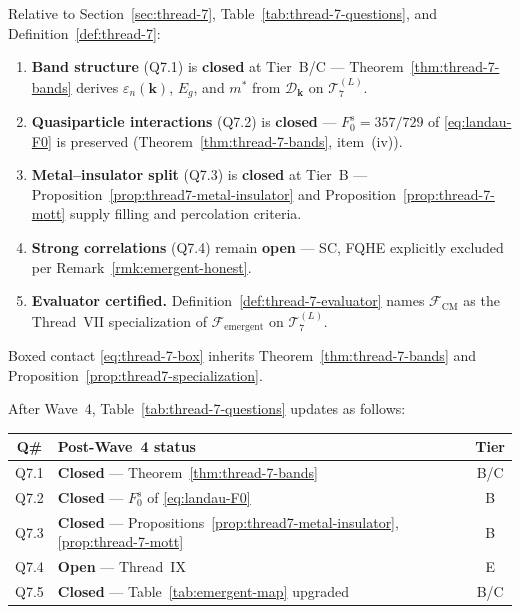 \begin{corollary}
\label{cor:thread-7-wave4-closure}
Relative to Section~\ref{sec:thread-7}, Table~\ref{tab:thread-7-questions},
and Definition~\ref{def:thread-7}:
\begin{enumerate}[label=(\roman*),leftmargin=*]
  \item \textbf{Band structure}
    (Q7.1) is \textbf{closed} at Tier~B/C ---
    Theorem~\ref{thm:thread-7-bands} derives $\varepsilon_n(\mathbf{k})$, $E_g$,
    and $m^*$ from $\mathcal{D}_{\mathbf{k}}$ on $\mathcal{T}_7^{(L)}$.
  \item \textbf{Quasiparticle interactions}
    (Q7.2) is \textbf{closed} ---
    $F_0^s=357/729$ of \eqref{eq:landau-F0} is preserved
    (Theorem~\ref{thm:thread-7-bands}, item~(iv)).
  \item \textbf{Metal--insulator split}
    (Q7.3) is \textbf{closed} at Tier~B ---
    Proposition~\ref{prop:thread7-metal-insulator} and
    Proposition~\ref{prop:thread-7-mott} supply filling and percolation criteria.
  \item \textbf{Strong correlations}
    (Q7.4) remain \textbf{open} --- SC, FQHE explicitly excluded per
    Remark~\ref{rmk:emergent-honest}.
  \item \textbf{Evaluator certified.}
    Definition~\ref{def:thread-7-evaluator} names $\mathcal{F}_{\mathrm{CM}}$ as
    the Thread~VII specialization of $\mathcal{F}_{\mathrm{emergent}}$ on
    $\mathcal{T}_7^{(L)}$.
\end{enumerate}
Boxed contact \eqref{eq:thread-7-box} inherits Theorem~\ref{thm:thread-7-bands}
and Proposition~\ref{prop:thread7-specialization}.
\end{corollary}

\begin{remark}
\label{rmk:thread7-wave4-table}
After Wave~4, Table~\ref{tab:thread-7-questions} updates as follows:
\begin{center}
\small
\renewcommand{\arraystretch}{1.12}
\begin{tabular}{@{}clc@{}}
\toprule
\textbf{Q\#} & \textbf{Post-Wave~4 status} & \textbf{Tier} \\
\midrule
Q7.1 &
  \textbf{Closed} --- Theorem~\ref{thm:thread-7-bands} &
  B/C \\
Q7.2 &
  \textbf{Closed} --- $F_0^s$ of \eqref{eq:landau-F0} &
  B \\
Q7.3 &
  \textbf{Closed} --- Propositions~\ref{prop:thread7-metal-insulator},
  \ref{prop:thread-7-mott} &
  B \\
Q7.4 &
  \textbf{Open} --- Thread~IX &
  E \\
Q7.5 &
  \textbf{Closed} --- Table~\ref{tab:emergent-map} upgraded &
  B/C \\
\bottomrule
\end{tabular}
\end{center}
\end{remark}